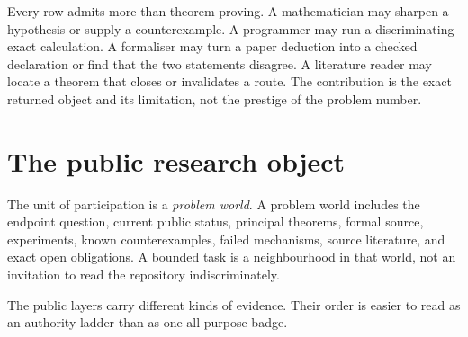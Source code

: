 \documentclass[10pt]{article}
\begin{document}
Every row admits more than theorem proving.  A mathematician may sharpen a
hypothesis or supply a counterexample.  A programmer may run a discriminating
exact calculation.  A formaliser may turn a paper deduction into a checked
declaration or find that the two statements disagree.  A literature reader
may locate a theorem that closes or invalidates a route.  The contribution is
the exact returned object and its limitation, not the prestige of the problem
number.

\section{The public research object}\label{sec:object}

The unit of participation is a \emph{problem world}.  A problem world includes
the endpoint question, current public status, principal theorems, formal
source, experiments, known counterexamples, failed mechanisms, source
literature, and exact open obligations.  A bounded task is a neighbourhood in
that world, not an invitation to read the repository indiscriminately.

The public layers carry different kinds of evidence.  Their order is easier to
read as an authority ladder than as one all-purpose badge.
\end{document}
